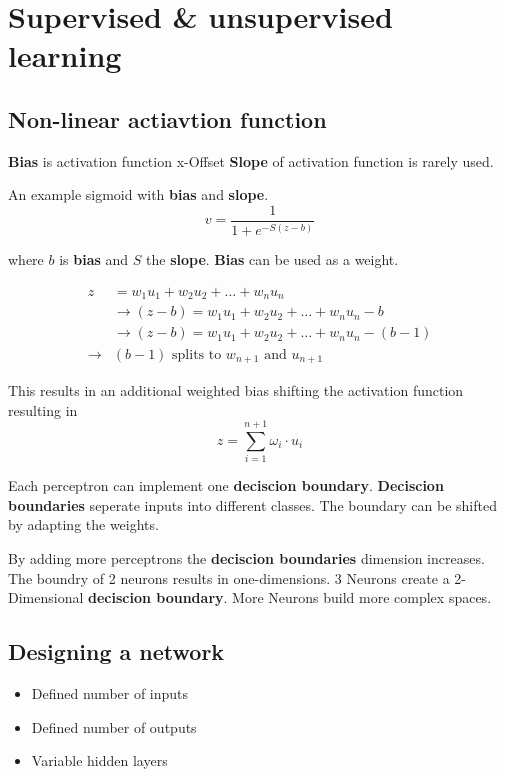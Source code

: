 \documentclass[
    fontsize      = 11pt,
    paper         = a4,
    twoside       = false,
    parskip       = half,
    pagesize      = false,
]{scrartcl}
\author{Robin Prillwitz}
\date{12. August 2022}
\providecommand{\tightlist}{%
  \setlength{\itemsep}{0pt}\setlength{\parskip}{0pt}}
\begin{document}
\hypertarget{supervised-unsupervised-learning}{%
\section{Supervised \& unsupervised
learning}\label{supervised-unsupervised-learning}}

\hypertarget{non-linear-actiavtion-function}{%
\subsection{Non-linear actiavtion
function}\label{non-linear-actiavtion-function}}

\textbf{Bias} is activation function x-Offset \textbf{Slope} of
activation function is rarely used.

An example sigmoid with \textbf{bias} and \textbf{slope}.
\[v =  \frac{1}{1+e^{-S(z-b)}}\]

where \(b\) is \textbf{bias} and \(S\) the \textbf{slope}. \textbf{Bias}
can be used as a weight.

\begin{align*}
z &= w_1u_1 + w_2u_2 + \ldots + w_nu_n \\
& \rightarrow (z-b) = w_1u_1 + w_2u_2 + \ldots + w_nu_n - b\\
& \rightarrow (z-b) = w_1u_1 + w_2u_2 + \ldots + w_nu_n - (b-1)\\[2ex]
\rightarrow & (b-1) \text{ splits to } w_{n+1} \text{ and } u_{n+1}
\end{align*}

This results in an additional weighted bias shifting the activation
function resulting in \[z = \sum_{i=1}^{n+1}\omega_i \cdot u_i\]

Each perceptron can implement one \textbf{deciscion boundary}.
\textbf{Deciscion boundaries} seperate inputs into different classes.
The boundary can be shifted by adapting the weights.

By adding more perceptrons the \textbf{deciscion boundaries} dimension
increases. The boundry of 2 neurons results in one-dimensions. 3 Neurons
create a 2-Dimensional \textbf{deciscion boundary}. More Neurons build
more complex spaces.

\hypertarget{designing-a-network}{%
\subsection{Designing a network}\label{designing-a-network}}

\begin{itemize}
\tightlist
\item
  Defined number of inputs
\item
  Defined number of outputs
\item
  Variable hidden layers
\end{itemize}
\end{document}
